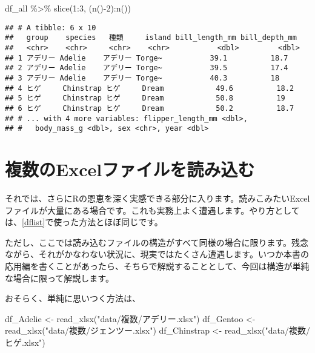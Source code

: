 \documentclass[
  xelatex,ja=standard, b5paper]{bxjsbook}
\newenvironment{Shaded}{\begin{snugshade}}{\end{snugshade}}
\newcommand{\DecValTok}[1]{\textcolor[rgb]{0.00,0.00,0.81}{#1}}
\newcommand{\FunctionTok}[1]{\textcolor[rgb]{0.00,0.00,0.00}{#1}}
\newcommand{\NormalTok}[1]{#1}
\newcommand{\OtherTok}[1]{\textcolor[rgb]{0.56,0.35,0.01}{#1}}
\newcommand{\SpecialCharTok}[1]{\textcolor[rgb]{0.00,0.00,0.00}{#1}}
\newcommand{\StringTok}[1]{\textcolor[rgb]{0.31,0.60,0.02}{#1}}
\begin{document}
\begin{Shaded}
\begin{Highlighting}[]
\NormalTok{df\_all }\SpecialCharTok{\%\textgreater{}\%} 
  \FunctionTok{slice}\NormalTok{(}\DecValTok{1}\SpecialCharTok{:}\DecValTok{3}\NormalTok{, (}\FunctionTok{n}\NormalTok{()}\SpecialCharTok{{-}}\DecValTok{2}\NormalTok{)}\SpecialCharTok{:}\FunctionTok{n}\NormalTok{())}
\end{Highlighting}
\end{Shaded}

\begin{verbatim}
## # A tibble: 6 x 10
##   group    species   種類     island bill_length_mm bill_depth_mm
##   <chr>    <chr>     <chr>    <chr>           <dbl>         <dbl>
## 1 アデリー Adelie    アデリー Torge~           39.1          18.7
## 2 アデリー Adelie    アデリー Torge~           39.5          17.4
## 3 アデリー Adelie    アデリー Torge~           40.3          18  
## 4 ヒゲ     Chinstrap ヒゲ     Dream            49.6          18.2
## 5 ヒゲ     Chinstrap ヒゲ     Dream            50.8          19  
## 6 ヒゲ     Chinstrap ヒゲ     Dream            50.2          18.7
## # ... with 4 more variables: flipper_length_mm <dbl>,
## #   body_mass_g <dbl>, sex <chr>, year <dbl>
\end{verbatim}

\newpage

\hypertarget{readseveralexcel}{%
\section{複数のExcelファイルを読み込む}\label{readseveralexcel}}

それでは、さらにRの恩恵を深く実感できる部分に入ります。読みこみたいExcelファイルが大量にある場合です。これも実務上よく遭遇します。やり方としては、\ref{dflist}で使った方法とほぼ同じです。

ただし、ここでは読み込むファイルの構造がすべて同様の場合に限ります。残念ながら、それがかなわない状況に、現実ではたくさん遭遇します。いつか本書の応用編を書くことがあったら、そちらで解説することとして、今回は構造が単純な場合に限って解説します。

おそらく、単純に思いつく方法は、

\begin{Shaded}
\begin{Highlighting}[]
\NormalTok{df\_Adelie    }\OtherTok{\textless{}{-}} \FunctionTok{read\_xlsx}\NormalTok{(}\StringTok{"data/複数/アデリー.xlsx"}\NormalTok{)}
\NormalTok{df\_Gentoo    }\OtherTok{\textless{}{-}} \FunctionTok{read\_xlsx}\NormalTok{(}\StringTok{"data/複数/ジェンツー.xlsx"}\NormalTok{)}
\NormalTok{df\_Chinstrap }\OtherTok{\textless{}{-}} \FunctionTok{read\_xlsx}\NormalTok{(}\StringTok{"data/複数/ヒゲ.xlsx"}\NormalTok{)}
\end{Highlighting}
\end{Shaded}
\end{document}
